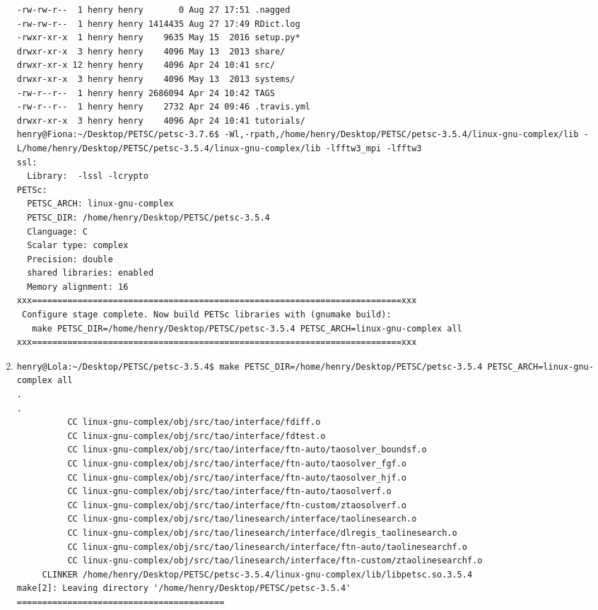 \documentclass{article}
\begin{document}
\begin{enumerate}
\begin{verbatim}
-rw-rw-r--  1 henry henry       0 Aug 27 17:51 .nagged
-rw-rw-r--  1 henry henry 1414435 Aug 27 17:49 RDict.log
-rwxr-xr-x  1 henry henry    9635 May 15  2016 setup.py*
drwxr-xr-x  3 henry henry    4096 May 13  2013 share/
drwxr-xr-x 12 henry henry    4096 Apr 24 10:41 src/
drwxr-xr-x  3 henry henry    4096 May 13  2013 systems/
-rw-r--r--  1 henry henry 2686094 Apr 24 10:42 TAGS
-rw-r--r--  1 henry henry    2732 Apr 24 09:46 .travis.yml
drwxr-xr-x  3 henry henry    4096 Apr 24 10:41 tutorials/
henry@Fiona:~/Desktop/PETSC/petsc-3.7.6$ -Wl,-rpath,/home/henry/Desktop/PETSC/petsc-3.5.4/linux-gnu-complex/lib -L/home/henry/Desktop/PETSC/petsc-3.5.4/linux-gnu-complex/lib -lfftw3_mpi -lfftw3
ssl:
  Library:  -lssl -lcrypto
PETSc:
  PETSC_ARCH: linux-gnu-complex
  PETSC_DIR: /home/henry/Desktop/PETSC/petsc-3.5.4
  Clanguage: C
  Scalar type: complex
  Precision: double
  shared libraries: enabled
  Memory alignment: 16
xxx=========================================================================xxx
 Configure stage complete. Now build PETSc libraries with (gnumake build):
   make PETSC_DIR=/home/henry/Desktop/PETSC/petsc-3.5.4 PETSC_ARCH=linux-gnu-complex all
xxx=========================================================================xxx
\end{verbatim}
\normalsize
\item 
\tiny
\begin{verbatim}
henry@Lola:~/Desktop/PETSC/petsc-3.5.4$ make PETSC_DIR=/home/henry/Desktop/PETSC/petsc-3.5.4 PETSC_ARCH=linux-gnu-complex all  
.
.          
          CC linux-gnu-complex/obj/src/tao/interface/fdiff.o
          CC linux-gnu-complex/obj/src/tao/interface/fdtest.o
          CC linux-gnu-complex/obj/src/tao/interface/ftn-auto/taosolver_boundsf.o
          CC linux-gnu-complex/obj/src/tao/interface/ftn-auto/taosolver_fgf.o
          CC linux-gnu-complex/obj/src/tao/interface/ftn-auto/taosolver_hjf.o
          CC linux-gnu-complex/obj/src/tao/interface/ftn-auto/taosolverf.o
          CC linux-gnu-complex/obj/src/tao/interface/ftn-custom/ztaosolverf.o
          CC linux-gnu-complex/obj/src/tao/linesearch/interface/taolinesearch.o
          CC linux-gnu-complex/obj/src/tao/linesearch/interface/dlregis_taolinesearch.o
          CC linux-gnu-complex/obj/src/tao/linesearch/interface/ftn-auto/taolinesearchf.o
          CC linux-gnu-complex/obj/src/tao/linesearch/interface/ftn-custom/ztaolinesearchf.o
     CLINKER /home/henry/Desktop/PETSC/petsc-3.5.4/linux-gnu-complex/lib/libpetsc.so.3.5.4
make[2]: Leaving directory '/home/henry/Desktop/PETSC/petsc-3.5.4'
=========================================

\end{verbatim}
\end{enumerate}
\end{document}
